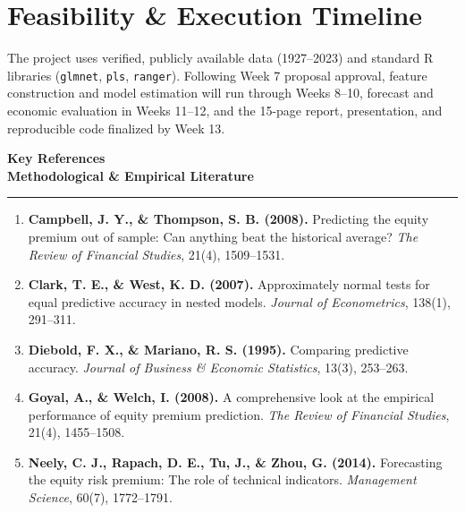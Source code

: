 \documentclass[10pt,a4paper]{article}
\begin{document}
\section{Feasibility \& Execution Timeline}
The project uses verified, publicly available data (1927--2023) and standard R libraries (\texttt{glmnet}, \texttt{pls}, \texttt{ranger}). Following Week 7 proposal approval, feature construction and model estimation will run through Weeks 8--10, forecast and economic evaluation in Weeks 11--12, and the 15-page report, presentation, and reproducible code finalized by Week 13.

\newpage

\begin{center}
    {\Large \textbf{Key References}}\\[2pt]
    {\normalsize \textbf{Methodological \& Empirical Literature}}
\end{center}
\vspace{-2pt}
\noindent\rule{\textwidth}{0.6pt}
\vspace{6pt}

\begin{enumerate}[leftmargin=*,itemsep=10pt,topsep=6pt]
    \item \textbf{Campbell, J. Y., \& Thompson, S. B. (2008).} Predicting the equity premium out of sample: Can anything beat the historical average? \textit{The Review of Financial Studies}, 21(4), 1509--1531.
    \item \textbf{Clark, T. E., \& West, K. D. (2007).} Approximately normal tests for equal predictive accuracy in nested models. \textit{Journal of Econometrics}, 138(1), 291--311.
    \item \textbf{Diebold, F. X., \& Mariano, R. S. (1995).} Comparing predictive accuracy. \textit{Journal of Business \& Economic Statistics}, 13(3), 253--263.
    \item \textbf{Goyal, A., \& Welch, I. (2008).} A comprehensive look at the empirical performance of equity premium prediction. \textit{The Review of Financial Studies}, 21(4), 1455--1508.
    \item \textbf{Neely, C. J., Rapach, D. E., Tu, J., \& Zhou, G. (2014).} Forecasting the equity risk premium: The role of technical indicators. \textit{Management Science}, 60(7), 1772--1791.
\end{enumerate}
\end{document}
